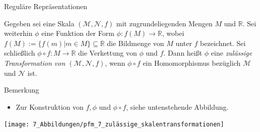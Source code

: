 \documentclass[
  8pt,
  ignorenonframetext,
]{beamer}
\providecommand{\tightlist}{%
  \setlength{\itemsep}{0pt}\setlength{\parskip}{0pt}}
\begin{document}
\begin{frame}{Reguläre Repräsentationen}
\protect\hypertarget{reguluxe4re-repruxe4sentationen}{}
\footnotesize
\begin{definition}
\justifying
Gegeben sei eine Skala $(\mathcal{M},\mathcal{N},f)$ mit zugrundeliegenden Mengen $M$
und $\mathbb{R}$. Sei weiterhin $\phi$ eine Funktion der Form $\phi : f(M) \to \mathbb{R}$, 
wobei $f(M) := \{f(m)|m\in M\}\subseteq \mathbb{R}$ die Bildmenge von $M$ unter $f$ bezeichnet. 
Sei schließlich $\phi \circ f : M \to \mathbb{R}$ die Verkettung von $\phi$ und $f$. 
Dann heißt $\phi$ eine \textit{zulässige Transformation von $(\mathcal{M},\mathcal{N},f)$}, 
wenn $\phi \circ f$ ein Homomorphismus bezüglich $\mathcal{M}$ und $\mathcal{N}$ ist.
\end{definition}
\footnotesize

Bemerkung

\begin{itemize}
\tightlist
\item
  Zur Konstruktion von \(f, \phi\) und \(\phi\circ f\), siehe
  untenstehende Abbildung.
\end{itemize}

\begin{center}\texttt{[image: 7\_Abbildungen/pfm\_7\_zulässige\_skalentransformationen]} \end{center}
\end{frame}
\end{document}
